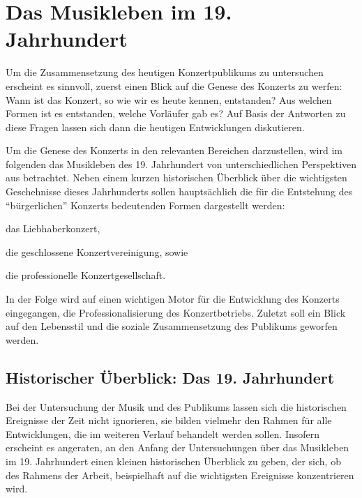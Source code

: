 \documentclass[a4paper, german, oneside]{scrbook}
\begin{document}




\chapter{Das Musikleben im 19. Jahrhundert}
\label{19jh}

Um die Zusammensetzung des heutigen Konzertpublikums zu untersuchen erscheint es sinnvoll, zuerst einen Blick auf die Genese des Konzerts zu werfen: Wann ist das Konzert, so wie wir es heute kennen, entstanden? Aus welchen Formen ist es entstanden, welche Vorläufer gab es? Auf Basis der Antworten zu diese Fragen lassen sich dann die heutigen Entwicklungen diskutieren.

Um die Genese des Konzerts in den relevanten Bereichen darzustellen, wird im folgenden das Musikleben des 19. Jahrhundert von unterschiedlichen Perspektiven aus betrachtet. Neben einem kurzen historischen Überblick über die wichtigsten Geschehnisse dieses Jahrhunderts sollen hauptsächlich die für die Entstehung des \enquote{bürgerlichen} Konzerts bedeutenden Formen dargestellt werden: 
\begin{inparaenum}[(1)]
	\item das Liebhaberkonzert, 
	\item die geschlossene Konzertvereinigung, sowie 
	\item die professionelle Konzertgesellschaft.
\end{inparaenum}

In der Folge wird auf einen wichtigen Motor für die Entwicklung des Konzerts eingegangen, die Professionalisierung des Konzertbetriebs. Zuletzt soll ein Blick auf den Lebensstil und die soziale Zusammensetzung des Publikums geworfen werden.


\section{Historischer Überblick: Das 19. Jahrhundert}
\label{histUberblick}
Bei der Untersuchung der Musik und des Publikums lassen sich die historischen Ereignisse der Zeit nicht ignorieren, sie bilden vielmehr den Rahmen für alle Entwicklungen, die im weiteren Verlauf behandelt werden sollen. Insofern erscheint es angeraten, an den Anfang der Untersuchungen über das Musikleben im 19. Jahrhundert einen kleinen historischen Überblick zu geben, der sich, ob des Rahmens der Arbeit, beispielhaft auf die wichtigsten Ereignisse konzentrieren wird.
\end{document}
